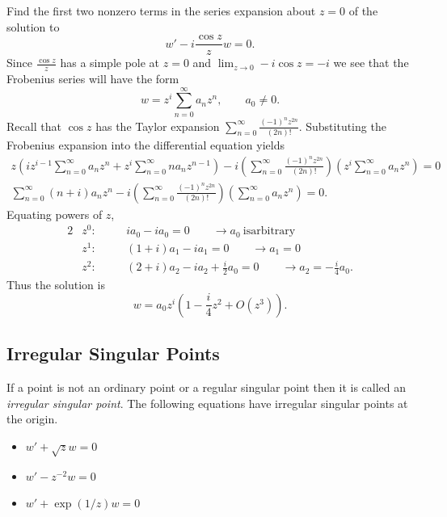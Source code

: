 \begin{Example}
  Find the first two nonzero terms in the series expansion about $z=0$ 
  of the solution to
  \[
  w' - i \frac{\cos z}{z} w = 0.
  \]
  Since $\frac{\cos z}{z}$ has a simple pole at $z=0$ and 
  $\lim_{z \to 0} -i \cos z = -i$
  we see that the Frobenius series will have the form
  \[ 
  w = z^i \sum_{n=0}^\infty a_n z^n, \qquad a_0 \neq 0.
  \]
  Recall that $\cos z$ has the Taylor expansion 
  $\sum_{n=0}^\infty \frac{(-1)^n z^{2n}}{(2n)!}$.  
  Substituting the Frobenius expansion into the differential equation yields
  \begin{gather*}
    z \left( i z^{i-1} \sum_{n=0}^\infty a_n z^n 
      + z^i \sum_{n=0}^\infty n a_n z^{n-1} \right)
    - i \left(\sum_{n=0}^\infty \frac{(-1)^n z^{2n}}{(2n)!}\right)
    \left( z^i \sum_{n=0}^\infty a_n z^n\right) = 0 \\
    \sum_{n=0}^\infty(n+i)a_n z^n 
    -i  \left(\sum_{n=0}^\infty \frac{(-1)^n z^{2n}}{(2n)!}\right)
    \left(\sum_{n=0}^\infty a_n z^n\right) = 0. 
  \end{gather*}
  Equating powers of $z$,
  \begin{alignat*}{2}
    &z^0:   &\quad  &i a_0 -i a_0 = 0 \qquad \to a_0\ \mathrm{is arbitrary} \\
    &z^1:   &\quad  &(1+i)a_1 - i a_1 = 0 \qquad \to a_1 = 0 \\
    &z^2:   &\quad  &(2+i)a_2 - i a_2 + \frac{i}{2} a_0 = 0 
    \qquad \to a_2 = -\frac{i}{4}a_0.
  \end{alignat*}
  Thus the solution is
  \[ 
  \boxed{
    w = a_0 z^i \left(1 -\frac{i}{4}z^2 + O(z^3) \right).
    }
  \]
\end{Example}











\subsection{Irregular Singular Points}


If a point is not an ordinary point or a regular singular point then it 
is called an \textit{irregular singular point}. The following equations have
irregular singular points at the origin.
\begin{itemize}
\item $w' + \sqrt{z} w = 0$ 
\item $w' - z^{-2} w = 0$ 
\item $w' + \exp(1/z) w = 0$
\end{itemize}





